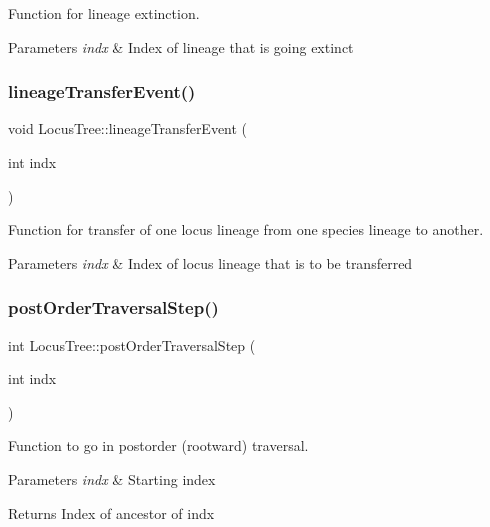 Function for lineage extinction. 


\begin{DoxyParams}{Parameters}
{\em indx} & Index of lineage that is going extinct \\
\hline
\end{DoxyParams}
\mbox{\label{class_locus_tree_a8123a4d6570c6325e5924dfc6644d430}} 
\subsubsection{\texorpdfstring{lineageTransferEvent()}{lineageTransferEvent()}}
{\footnotesize\ttfamily void Locus\+Tree\+::lineage\+Transfer\+Event (\begin{DoxyParamCaption}\item[{int}]{indx }\end{DoxyParamCaption})}



Function for transfer of one locus lineage from one species lineage to another. 


\begin{DoxyParams}{Parameters}
{\em indx} & Index of locus lineage that is to be transferred \\
\hline
\end{DoxyParams}
\mbox{\label{class_locus_tree_a612c899bfa5f06b2277f7032bca394d2}} 
\subsubsection{\texorpdfstring{postOrderTraversalStep()}{postOrderTraversalStep()}}
{\footnotesize\ttfamily int Locus\+Tree\+::post\+Order\+Traversal\+Step (\begin{DoxyParamCaption}\item[{int}]{indx }\end{DoxyParamCaption})}



Function to go in postorder (rootward) traversal. 


\begin{DoxyParams}{Parameters}
{\em indx} & Starting index \\
\hline
\end{DoxyParams}
\begin{DoxyReturn}{Returns}
Index of ancestor of indx 
\end{DoxyReturn}
\mbox{\label{class_locus_tree_ab4a4727ab800808da5031a16eccb3162}} 
